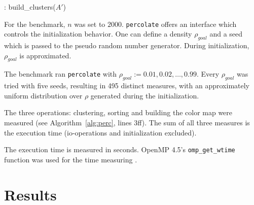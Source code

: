 \documentclass[twoside,11pt]{article}
\def\perc{\texttt{perco\-late}}
\begin{document}
\begin{algorithm}
  \caption{: build\_clusters($A'$)}
  \label{alg:build_clusters}

  \begin{algorithmic}[1]
      \ENDFOR
    \ENDWHILE
  \end{algorithmic}
\end{algorithm}

For the benchmark, $n$ was set to $2000$.
\perc{} offers an interface which controls the
initialization behavior.
One can define a density $\rho_{goal}$ and a seed which is
passed to the pseudo random number generator.
During initialization, $\rho_{goal}$ is approximated.

The benchmark ran \perc{} with $\rho_{goal} :=
0.01,0.02,\dots,0.99$. Every $\rho_{goal}$ was tried with
five seeds, resulting in 495 distinct measures, with an
approximately uniform distribution over $\rho$ generated
during the initialization.

The three operations: clustering, sorting and building the
color map were measured (see Algorithm~\ref{alg:perc},
lines 3ff).
The sum of all three measures is the execution time
(io-operations and initialization excluded).

The execution time is measured in seconds.
OpenMP 4.5's \texttt{omp\_get\_wtime} function was used
for the time measuring \citep[see][Chapter 3.4.1]{openmp}.


\section{Results} %
\end{document}

